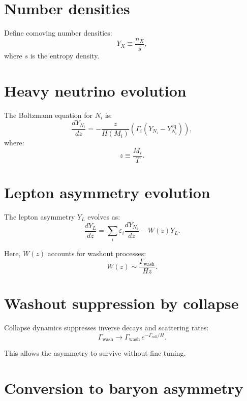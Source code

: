 \documentclass[11pt]{book}
\begin{document}
\section{Number densities}

Define comoving number densities:
\begin{equation}
Y_X \equiv \frac{n_X}{s},
\end{equation}
where $s$ is the entropy density.

\section{Heavy neutrino evolution}

The Boltzmann equation for $N_i$ is:
\begin{equation}
\frac{dY_{N_i}}{dz}
=
-\frac{z}{H(M_i)}
\left(
\Gamma_i (Y_{N_i} - Y_{N_i}^{\mathrm{eq}})
\right),
\end{equation}
where:
\begin{equation}
z \equiv \frac{M_i}{T}.
\end{equation}

\section{Lepton asymmetry evolution}

The lepton asymmetry $Y_L$ evolves as:
\begin{equation}
\frac{dY_L}{dz}
=
\sum_i
\varepsilon_i
\frac{dY_{N_i}}{dz}
-
W(z) Y_L.
\end{equation}

Here, $W(z)$ accounts for washout processes:
\begin{equation}
W(z) \sim \frac{\Gamma_{\mathrm{wash}}}{H z}.
\end{equation}

\section{Washout suppression by collapse}

Collapse dynamics suppresses inverse decays and scattering rates:
\begin{equation}
\Gamma_{\mathrm{wash}} \to
\Gamma_{\mathrm{wash}}\,e^{-\Gamma_{\mathrm{coll}}/H}.
\end{equation}

This allows the asymmetry to survive without fine tuning.

\section{Conversion to baryon asymmetry}
\end{document}
